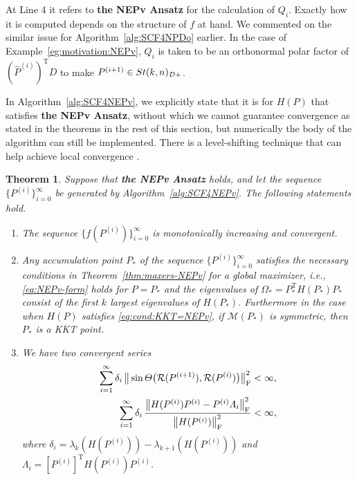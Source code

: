\documentclass[11pt]{article}
\def\scrM{\mathscr{M}}
\def\cR{{\cal R}}
\def\what{\widehat}
\newcommand\STM[2]{{\rm St}(#1,#2)}
\DeclareMathOperator{\tr}{tr}
\DeclareMathOperator{\F}{F}
\DeclareMathOperator{\T}{T}
\newtheorem{theorem}{Theorem}[section]
\theoremstyle{definition}
\numberwithin{equation}{section}
\begin{document}
At Line 4 it refers to  {\bf the NEPv Ansatz} for the calculation of $Q_i$.
Exactly how it is computed depends on the structure of $f$ at hand. We commented on the similar issue for Algorithm~\ref{alg:SCF4NPDo} earlier. In the case of Example~\ref{eg:motivation:NEPv}, $Q_i$ is taken to be
an orthonormal polar factor of $(\what P^{(i)})^{\T}D$ to make $P^{(i+1)}\in\STM{k}{n}_{D+}$.

In Algorithm~\ref{alg:SCF4NEPv}, we explicitly state that it is for $H(P)$ that satisfies {\bf the NEPv Ansatz}, without which
we cannot guarantee convergence as stated in the theorems in the rest of this section, but numerically the body of
the algorithm can still be implemented. There is a level-shifting technique that can help achieve local convergence
\cite{ball:2022,luli:2024}.

\begin{theorem}\label{thm:cvg4SCF4NEPv}
Suppose that {\bf the NEPv Ansatz} holds, and let the sequence $\{P^{(i)}\}_{i=0}^{\infty}$ be generated by Algorithm~\ref{alg:SCF4NEPv}.
The following statements hold.
\begin{enumerate}[{\rm (a)}]
  \item The sequence $\{f(P^{(i)})\}_{i=0}^{\infty}$ is monotonically increasing and convergent.
  \item Any accumulation point $P_*$ of the sequence $\{P^{(i)}\}_{i=0}^{\infty}$ satisfies
        the necessary conditions in Theorem~\ref{thm:maxers-NEPv} for a global maximizer, i.e.,
        \eqref{eq:NEPv-form} holds for $P=P_*$ and the eigenvalues of $\Omega_*=P_*^{\T}H(P_*)P_*$
        consist of the first $k$ largest eigenvalues of $H(P_*)$.
        Furthermore in the case when $H(P)$
        satisfies \eqref{eq:cond:KKT=NEPv}, if $\scrM(P_*)$ is symmetric, then $P_*$ is a KKT point.
  \item We have two convergent series
        \begin{subequations}\label{eq:cvg4SCF4NEPv:series}
        \begin{align}
         \sum_{i=1}^{\infty}\delta_i\,\big\|\sin\Theta\big(\cR(P^{(i+1)}),\cR(P^{(i)})\big)\big\|_{\F}^2
                      &<\infty,      \label{eq:cvg4SCF4NEPv:series-1} \\
         \sum_{i=1}^{\infty}\delta_i\,
                       \frac {\big\|H(P^{(i)})P^{(i)}-P^{(i)}\Lambda_i\big\|_{\F}^2}
                             {\big\|H(P^{(i)})\big\|_{\F}^2}
                      &<\infty,                    \label{eq:cvg4SCF4NEPv:series-2}
        \end{align}
        \end{subequations}
        where $\delta_i=\lambda_k(H(P^{(i)}))-\lambda_{k+1}(H(P^{(i)}))$ and
        $\Lambda_i=[P^{(i)}]^{\T}H(P^{(i)})P^{(i)}$.
\end{enumerate}
\end{theorem}
\end{document}
